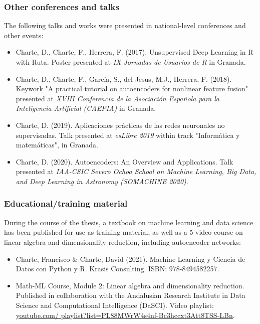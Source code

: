 \subsubsection{Other conferences and talks}

The following talks and works were presented in national-level conferences and other events:

\begin{itemize}
    \item Charte, D., Charte, F., Herrera, F. (2017). Unsupervised Deep Learning in R with Ruta. Poster presented at \textit{IX Jornadas de Usuarios de R} in Granada.
    \item Charte, D., Charte, F., García, S., del Jesus, M.J., Herrera, F. (2018). Keywork "A practical tutorial on autoencoders for nonlinear feature fusion" presented at \textit{XVIII Conferencia de la Asociación Española para la Inteligencia Artificial (CAEPIA)} in Granada.
    \item Charte, D. (2019). Aplicaciones prácticas de las redes neuronales no supervisadas. Talk presented at \textit{esLibre 2019} within track "Informática y matemáticas", in Granada.
    \item Charte, D. (2020). Autoencoders: An Overview and Applications. Talk presented at \textit{IAA-CSIC Severo Ochoa School on Machine Learning, Big Data, and Deep Learning in Astronomy (SOMACHINE 2020)}.
\end{itemize}

\subsubsection{Educational/training material}

During the course of the thesis, a textbook on machine learning and data science has been published for use as training material, as well as a 5-video course on linear algebra and dimensionality reduction, including autoencoder networks:

\begin{itemize}
    \item Charte, Francisco \& Charte, David (2021). Machine Learning y Ciencia de Datos con Python y R. Krasis Consulting. ISBN: 978-8494582257.
    \item Math-ML Course, Module 2: Linear algebra and dimensionality reduction. Published in collaboration with the Andalusian Research Institute in Data Science and Computational Intelligence (DaSCI). Video playlist: \href{https://www.youtube.com/playlist?list=PL88MWrW4s4nf-Bc3hccxt3Att8TSS-LBn}{youtube.com/ playlist?list=PL88MWrW4s4nf-Bc3hccxt3Att8TSS-LBn}.
\end{itemize}

